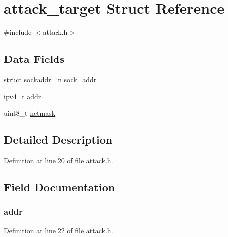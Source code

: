 \hypertarget{structattack__target}{}\section{attack\+\_\+target Struct Reference}
\label{structattack__target}


{\ttfamily \#include $<$attack.\+h$>$}

\subsection*{Data Fields}
\begin{DoxyCompactItemize}
\item 
struct sockaddr\+\_\+in \hyperlink{structattack__target_a2c92e670338226b0409a366df2dc53da}{sock\+\_\+addr}
\item 
\hyperlink{loader_2src_2headers_2includes_8h_aaadf2e480fd246ff9e932039b223baed}{ipv4\+\_\+t} \hyperlink{structattack__target_a587426ea8fb6d0cbb271fa3abee2219c}{addr}
\item 
uint8\+\_\+t \hyperlink{structattack__target_aa42d0389fa417fb1afc191722982311f}{netmask}
\end{DoxyCompactItemize}


\subsection{Detailed Description}


Definition at line 20 of file attack.\+h.



\subsection{Field Documentation}
\subsubsection[{\texorpdfstring{addr}{addr}}]{ addr}\hypertarget{structattack__target_a587426ea8fb6d0cbb271fa3abee2219c}{}\label{structattack__target_a587426ea8fb6d0cbb271fa3abee2219c}


Definition at line 22 of file attack.\+h.

